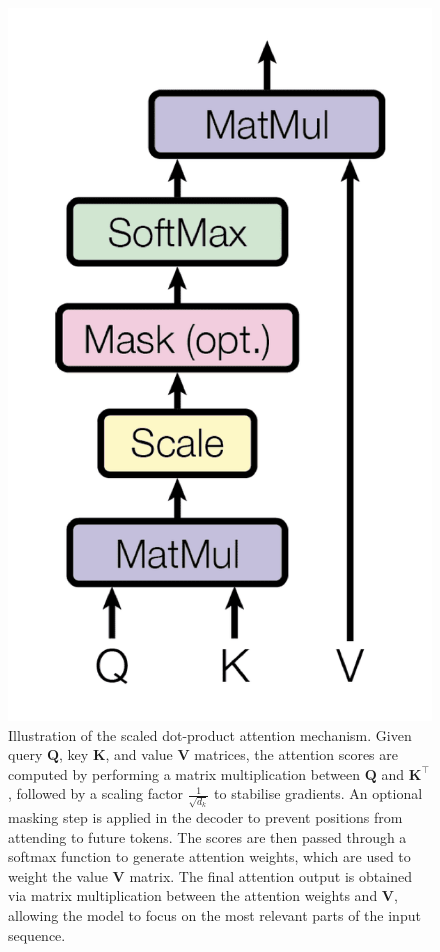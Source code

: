 \begin{figure}[htbp]
  \centering
  \includegraphics[scale=0.2]{../sections/transformer-architecture/attachments/scaled-dot-product-attention.png}
  \caption{Illustration of the scaled dot-product attention mechanism. Given query $\mathbf{Q}$, key $\mathbf{K}$, and value $\mathbf{V}$ matrices, the attention scores are computed by performing a matrix multiplication between $\mathbf{Q}$ and $\mathbf{K}^\intercal$, followed by a scaling factor $\frac{1}{\sqrt{d_k}}$ to stabilise gradients. An optional masking step is applied in the decoder to prevent positions from attending to future tokens. The scores are then passed through a softmax function to generate attention weights, which are used to weight the value $\mathbf{V}$ matrix. The final attention output is obtained via matrix multiplication between the attention weights and $\mathbf{V}$, allowing the model to focus on the most relevant parts of the input sequence.}\label{fig:scaled-dot-product-attention}
\end{figure}

